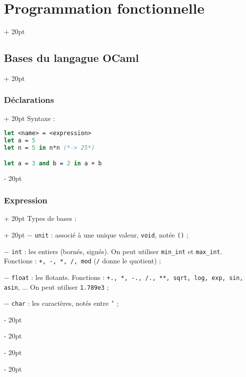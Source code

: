 \documentclass[a4paper, 12pt, twoside]{article}
\newcommand{\ind}[1][20pt]{\advance\leftskip + #1}
\newcommand{\deind}[1][20pt]{\advance\leftskip - #1}
\newenvironment{indentedenv}[1][20pt]{\par \ind[#1]}{\par \deind}
\newenvironment{indt}[2][20pt]{#2 \begin{indentedenv}[#1]}{\end{indentedenv}} %
\begin{document}
    \begin{indt}{\section{Programmation fonctionnelle}}
        
        \begin{indt}{\subsection{Bases du langague OCaml}}
            
            \begin{indt}{\subsubsection{Déclarations}}
                Syntaxe :
                
                \begin{lstlisting}[language=Caml, xleftmargin=90pt]
let <name> = <expression>
let a = 5
let n = 5 in n*n (*-> 25*)

let a = 3 and b = 2 in a + b
                \end{lstlisting}
            \end{indt}
            
            \vspace{12pt}
            
            \begin{indt}{\subsubsection{Expression}}
                \begin{indt}{Types de bases :}
                    $-$ \texttt{unit} : associé à une unique valeur, \texttt{void}, notée \texttt{()} ;
                    
                    $-$ \texttt{int} : les entiers (bornés, signés). On peut utiliser \texttt{min\_int} et \texttt{max\_int}. Fonctions : \texttt{+, -, *, /, mod} (\texttt{/} donne le quotient) ;
                    
                    $-$ \texttt{float} : les flotants. Fonctions : \texttt{+., *, -., /., **, sqrt, log, exp, sin, asin}, ... On peut utiliser \texttt{1.789e3} ;
                    
                    $-$ \texttt{char} : les caractères, notés entre \texttt{'} ;
                    

\end{indt}
\end{indt}
\end{indt}
\end{indt}
\end{document}
